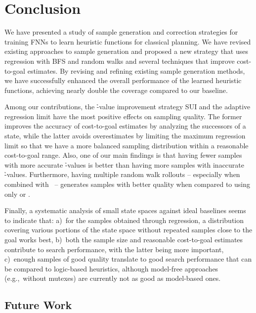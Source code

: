 \chapter{Conclusion}
\label{sec:conclusion}

We have presented a study of sample generation and correction strategies for training FNNs to learn heuristic functions for classical planning. We have revised existing approaches to sample generation and proposed a new strategy that uses regression with BFS and random walks and several techniques that improve cost-to-goal estimates. By revising and refining existing sample generation methods, we have successfully enhanced the overall performance of the learned heuristic functions, achieving nearly double the coverage compared to our baseline.


Among our contributions, the \h-value improvement strategy SUI and the adaptive regression limit \rlmeanfx have the most positive effects on sampling quality. The former improves the accuracy of cost-to-goal estimates by analyzing the successors of a state, while the latter avoids overestimates by limiting the maximum regression limit so that we have a more balanced sampling distribution within a reasonable cost-to-goal range. Also, one of our main findings is that having fewer samples with more accurate \h-values is better than having more samples with inaccurate \h-values. Furthermore, having multiple random walk rollouts -- especially when combined with \bfs~-- generates samples with better quality when compared to using only \bfs or \dfs.

Finally, a systematic analysis of small state spaces against ideal baselines seems to indicate that: a)~for the samples obtained through regression, a distribution covering various portions of the state space without repeated samples close to the goal works best, b)~both the sample size and reasonable cost-to-goal estimates contribute to search performance, with the latter being more important, c)~enough samples of good quality translate to good search performance that can be compared to logic-based heuristics, although model-free approaches (e.g.,~without mutexes) are currently not as good as model-based ones.

\section{Future Work}
\label{sec:future-work}

